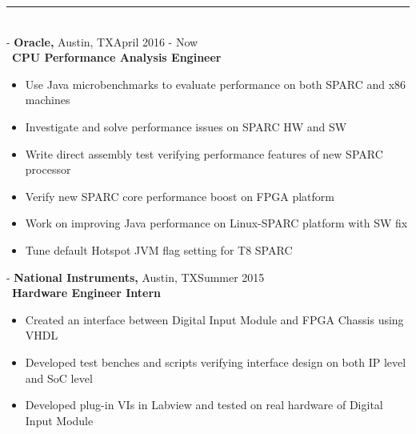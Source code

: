 \documentclass[12pt]{res}
\begin{document}
\begin{resume}
\vspace{-10pt}
\rule{18cm}{0.5mm}\\
 -\sectionwidth \resumewidth
{\textbf{Oracle,}  Austin, TX\hfill April 2016 - Now} \hspace{-0.58in}\vspace{-0mm}\\\
  \textbf{CPU Performance Analysis Engineer} \\
 \vspace{-14pt}
 \begin{itemize}[leftmargin=-0.1in]
   \item Use Java microbenchmarks to evaluate performance on both SPARC and x86 machines\vspace{-4pt}
   \item Investigate and solve performance issues on SPARC HW and SW  \vspace{-4pt}
   \item Write direct assembly test verifying performance features of new SPARC processor \vspace{-4pt}
   \item Verify new SPARC core performance boost on FPGA platform \vspace{-4pt}
   \item Work on improving Java performance on Linux-SPARC platform with SW fix\vspace{-4pt}
   \item Tune default Hotspot JVM flag setting for T8 SPARC \vspace{-4pt}
 \end{itemize}

\vspace{-10pt}

 -\sectionwidth \resumewidth
{\textbf{National Instruments,}  Austin, TX\hfill Summer 2015} \hspace{-0.58in}\vspace{-0mm}\\\
  \textbf{Hardware Engineer Intern} \\
 \vspace{-14pt}
 \begin{itemize}[leftmargin=-0.1in]
  \item Created an interface between Digital Input Module and FPGA Chassis using VHDL\vspace{-5pt}
  \item Developed test benches and scripts verifying interface design on both IP level and SoC level \vspace{-5pt}
  \item Developed plug-in VIs in Labview and tested on real hardware of Digital Input Module\\
   \end{itemize}\vspace{-28pt}
   

\end{resume}
\end{document}
